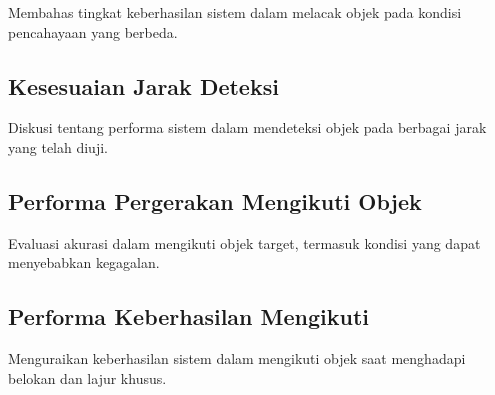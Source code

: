 Membahas tingkat keberhasilan sistem dalam melacak objek pada kondisi pencahayaan yang berbeda.

\subsection{Kesesuaian Jarak Deteksi}
\label{sec:kesesuaianjarak}

Diskusi tentang performa sistem dalam mendeteksi objek pada berbagai jarak yang telah diuji.

\subsection{Performa Pergerakan Mengikuti Objek}
\label{sec:akurasiikutiobjek}

Evaluasi akurasi dalam mengikuti objek target, termasuk kondisi yang dapat menyebabkan kegagalan.

\subsection{Performa Keberhasilan Mengikuti}
\label{sec:keberhasilanmengikuti}

Menguraikan keberhasilan sistem dalam mengikuti objek saat menghadapi belokan dan lajur khusus.